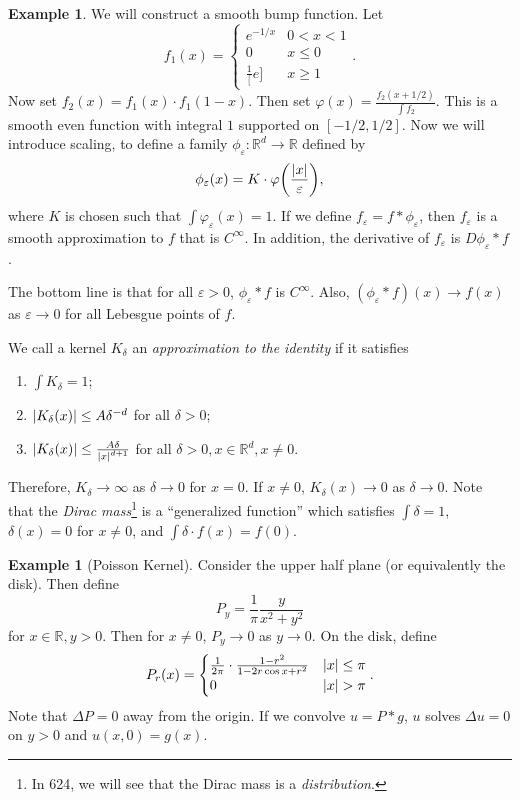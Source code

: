 \documentclass[leqno, openany]{memoir}
\theoremstyle{definition}
\newtheorem{exm}[thm]{Example}
\theoremstyle{remark}
\theoremstyle{plain}
\theoremstyle{definition}
\theoremstyle{remark}
\newcommand{\R}{\mathbb{R}}
\newcommand{\ep}{\varepsilon}
\begin{document}
\begin{exm}
    We will construct a smooth bump function. Let 
    \[ f_1(x) = \begin{cases}
        e^{-1/x} & 0 < x < 1 \\
        0 & x \leq 0 \\
        \frac{1}[e] & x \geq 1
    \end{cases}. \]
    Now set $f_2(x) = f_1(x) \cdot f_1(1-x)$. Then set $\varphi(x) = \frac{f_2(x+1/2)}{\int f_2}$. This is a smooth even function with integral $1$ supported on $[-1/2, 1/2]$. Now we will introduce scaling, to define a family $\phi_{\ep}: \R^d \to \R$ defined by
    \[ \phi_{\ep}(x) = K \cdot \varphi\qty(\frac{\abs{x}}{\ep}), \]
    where $K$ is chosen such that $\int \varphi_{\ep}(x) = 1$. If we define $f_{\ep} = f*\phi_{\ep}$, then $f_{\ep}$ is a smooth approximation to $f$ that is $C^{\infty}$. In addition, the derivative of $f_{\ep}$ is $D \phi_{\ep} * f$.

    The bottom line is that for all $\ep > 0$, $\phi_{\ep} * f$ is $C^{\infty}$. Also, $(\phi_{\ep} * f)(x) \to f(x)$ as $\ep \to 0$ for all Lebesgue points of $f$.
\end{exm}

We call a kernel $K_{\delta}$ an \textit{approximation to the identity} if it satisfies
\begin{enumerate}
    \item $\int K_{\delta} = 1$;
    \item $\abs{K_{\delta}(x)} \leq A \delta^{-d}$ for all $\delta > 0$;
    \item $\abs{K_{\delta}(x)} \leq \frac{A \delta}{\abs{x}^{d+1}}$ for all $\delta > 0, x \in \R^d, x \neq 0$.
\end{enumerate}
Therefore, $K_{\delta} \to \infty$ as $\delta \to 0$ for $x = 0$. If $x \neq 0$, $K_{\delta}(x) \to 0$ as $\delta \to 0$. Note that the \textit{Dirac mass}\footnote{In 624, we will see that the Dirac mass is a \textit{distribution}.} is a ``generalized function'' which satisfies $\int \delta = 1$, $\delta(x) = 0$ for $x \neq 0$, and $\int \delta \cdot f(x) = f(0)$.

\begin{exm}[Poisson Kernel]
    Consider the upper half plane (or equivalently the disk). Then define
    \[ P_y = \frac{1}{\pi} \frac{y}{x^2 + y^2} \]
    for $x \in \R, y > 0$. Then for $x \neq 0$, $P_y \to 0$ as $y \to 0$. On the disk, define
    \[ P_r(x) = \begin{cases}
        \frac{1}{2 \pi} \cdot \frac{1-r^2}{1 - 2r \cos x + r^2} & \abs{x} \leq \pi \\
        0 & \abs{x} > \pi
    \end{cases}. \]
    Note that $\Delta P = 0$ away from the origin. If we convolve $u = P * g$, $u$ solves $\Delta u = 0$ on $y > 0$ and $u(x,0) = g(x)$.
\end{exm}
\end{document}
